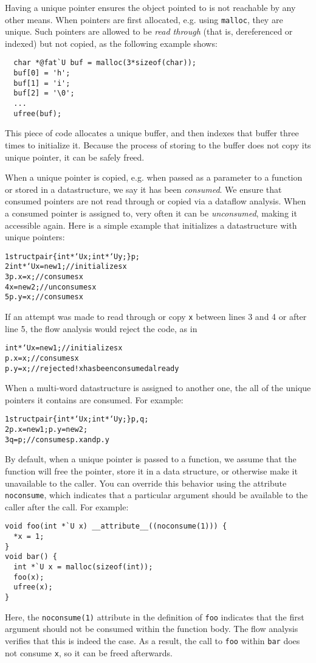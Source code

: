 Having a unique pointer ensures the object pointed to is not reachable by
any other means.  When pointers are first allocated, e.g. using
\texttt{malloc}, they are unique.  Such pointers are allowed to be
\emph{read through} (that is, dereferenced or indexed) but not copied, as
the following example shows:
\begin{verbatim}
  char *@fat`U buf = malloc(3*sizeof(char));
  buf[0] = 'h';
  buf[1] = 'i';
  buf[2] = '\0';
  ...
  ufree(buf);
\end{verbatim}
This piece of code allocates a unique buffer, and then indexes that buffer
three times to initialize it.  Because the process of storing to the
buffer does not copy its unique pointer, it can be safely freed.

When a unique pointer is copied, e.g. when passed as a parameter to a
function or stored in a datastructure, we say it has been \emph{consumed}.
We ensure that consumed pointers are not read through or copied via a
dataflow analysis.  When a consumed pointer is assigned to, very often it
can be \emph{unconsumed}, making it accessible again.  Here is a simple
example that initializes a datastructure with unique pointers:
\begin{alltt}
{\small 1}  struct pair \{ int *`U x; int *`U y; \} p;
{\small 2}  int *`U x = new 1;  // initializes x
{\small 3}  p.x = x;            // consumes x
{\small 4}  x = new 2;          // unconsumes x
{\small 5}  p.y = x;            // consumes x
\end{alltt}
If an attempt was made to read through or copy \texttt{x} between lines 3
and 4 or after line 5, the flow analysis would reject the code, as in
\begin{alltt}
  int *`U x = new 1;  // initializes x
  p.x = x;            // consumes x
  p.y = x;            // rejected! x has been consumed already
\end{alltt}
When a multi-word datastructure is assigned to another one, the all of the
unique pointers it contains are consumed.  For example:
\begin{alltt}
{\small 1}  struct pair \{ int *`U x; int *`U y; \} p, q;
{\small 2}  p.x = new 1; p.y = new 2;
{\small 3}  q = p;              // consumes p.x and p.y
\end{alltt}

By default, when a unique pointer is passed to a function, we assume that the
function will free the pointer, store it in a data structure, or otherwise
make it unavailable to the caller.  You can override this behavior using the
attribute \texttt{noconsume}, which indicates that a particular argument
should be available to the caller after the call.  For example:
\begin{verbatim}
void foo(int *`U x) __attribute__((noconsume(1))) {
  *x = 1;
}
void bar() {
  int *`U x = malloc(sizeof(int));
  foo(x);
  ufree(x);
}
\end{verbatim}
Here, the \texttt{noconsume(1)} attribute in the definition of \texttt{foo}
indicates that the first argument should not be consumed within the function
body.  The flow analysis verifies that this is indeed the case.  As a
result, the call to \texttt{foo} within \texttt{bar} does not consume
\texttt{x}, so it can be freed afterwards.

